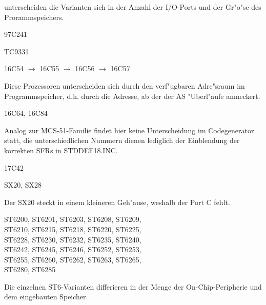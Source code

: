 \documentclass[12pt,a4paper,twoside]{report}
\newcommand{\asname}{AS}
\begin{document}
unterscheiden die Varianten sich in der Anzahl der I/O-Ports und der
Gr"o"se des Prorammspeichers.
\begin{cpulist}
   97C241
\end{cpulist}
\begin{cpulist}
   TC9331
\end{cpulist}
\begin{cpulist}
   16C54 $\rightarrow$ 16C55 $\rightarrow$ 16C56 $\rightarrow$ 16C57
\end{cpulist}
Diese Prozessoren unterscheiden sich durch den verf"ugbaren
Adre"sraum im Programmspeicher, d.h. durch die Adresse, ab der
der \asname{} "Uberl"aufe anmeckert.
\begin{cpulist}
   16C64, 16C84
\end{cpulist}
Analog zur MCS-51-Familie findet hier keine Unterscheidung im
Codegenerator statt, die unterschiedlichen Nummern dienen lediglich
der Einblendung der korrekten SFRs in STDDEF18.INC.
\begin{cpulist}
   17C42
\end{cpulist}
\begin{cpulist}
   SX20, SX28
\end{cpulist}
Der SX20 steckt in einem kleineren Geh"ause, weshalb der Port C
fehlt.
\begin{cpulist}
   ST6200, ST6201, ST6203, ST6208, ST6209,\\
\> ST6210, ST6215, ST6218, ST6220, ST6225,\\
\> ST6228, ST6230, ST6232, ST6235, ST6240,\\
\> ST6242, ST6245, ST6246, ST6252, ST6253,\\
\> ST6255, ST6260, ST6262, ST6263, ST6265,\\
\> ST6280, ST6285
\end{cpulist}
Die einzelnen ST6-Varianten differieren in der Menge der
On-Chip-Peripherie und dem eingebauten Speicher.
\end{document}
